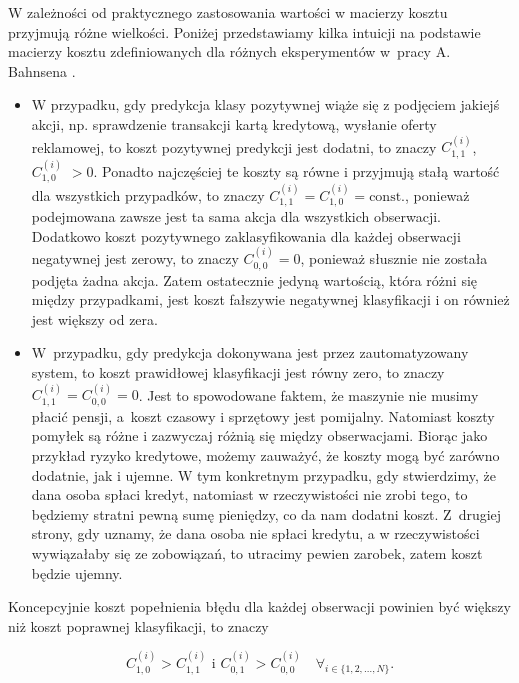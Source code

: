 \documentclass[inzynierska]{pwr_wmat_praca_dyplomowa}
\theoremstyle{plain}
\numberwithin{theorem}{chapter}
\theoremstyle{definition}
\numberwithin{theorem}{chapter}
\begin{document}
W zależności od praktycznego zastosowania wartości w macierzy kosztu przyjmują różne wielkości. Poniżej przedstawiamy kilka intuicji na podstawie macierzy kosztu zdefiniowanych dla różnych eksperymentów w~pracy A. Bahnsena \cite{alej2015ensemble}.
\begin{itemize}
	\item W przypadku, gdy predykcja klasy pozytywnej wiąże się z podjęciem jakiejś akcji, np. sprawdzenie transakcji kartą kredytową, wysłanie oferty reklamowej, to koszt pozytywnej predykcji jest dodatni, to znaczy $C^{(i)}_{1,1}$, $C^{(i)}_{1,0}$ $>0$. Ponadto najczęściej te koszty są równe i przyjmują stałą wartość dla wszystkich przypadków, to znaczy $C^{(i)}_{1,1} = C^{(i)}_{1,0} =  \text{const.}$, ponieważ podejmowana zawsze jest ta sama akcja dla wszystkich obserwacji. Dodatkowo koszt pozytywnego zaklasyfikowania dla każdej obserwacji negatywnej jest zerowy, to znaczy $C^{(i)}_{0,0} = 0$, ponieważ słusznie nie została podjęta żadna akcja. Zatem ostatecznie jedyną wartością, która różni się między przypadkami, jest koszt fałszywie negatywnej klasyfikacji i on również jest większy od zera.
	\item W~przypadku, gdy predykcja dokonywana jest przez zautomatyzowany system, to koszt prawidłowej klasyfikacji jest równy zero, to znaczy $C^{(i)}_{1,1} = C^{(i)}_{0,0} = 0$. Jest to spowodowane faktem, że maszynie nie musimy płacić pensji, a~koszt czasowy i sprzętowy jest pomijalny. Natomiast koszty pomyłek są różne i zazwyczaj różnią się między obserwacjami. Biorąc jako przykład ryzyko kredytowe, możemy zauważyć, że koszty mogą być zarówno dodatnie, jak i ujemne. W tym konkretnym przypadku, gdy stwierdzimy, że dana osoba spłaci kredyt, natomiast w rzeczywistości nie zrobi tego, to będziemy stratni pewną sumę pieniędzy, co da nam dodatni koszt. Z~drugiej strony, gdy uznamy, że dana osoba nie spłaci kredytu, a w rzeczywistości wywiązałaby się ze zobowiązań, to utracimy pewien zarobek, zatem koszt będzie ujemny.
\end{itemize}

Koncepcyjnie koszt popełnienia błędu dla każdej obserwacji powinien być większy niż koszt poprawnej klasyfikacji, to znaczy

$$ C^{(i)}_{1,0} > C^{(i)}_{1,1} \text{ i } C^{(i)}_{0,1} > C^{(i)}_{0,0} \quad \forall_{i \in \{1, 2, \dots, N\}} \text{.}$$
\end{document}
